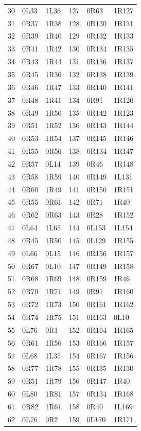 \begin{longtable}{@{}rllrll@{}}
30 & 0L33 & 1L36 & 127 & 0R63 & 1R127\\
31 & 0R37 & 1R38 & 128 & 0R130 & 1R131\\
32 & 0R39 & 1R40 & 129 & 0R132 & 1R133\\
33 & 0R41 & 1R42 & 130 & 0R134 & 1R135\\
34 & 0R43 & 1R44 & 131 & 0R136 & 1R137\\
35 & 0R45 & 1R36 & 132 & 0R138 & 1R139\\
36 & 0R46 & 1R47 & 133 & 0R140 & 1R141\\
37 & 0R48 & 1R41 & 134 & 0R91 & 1R120\\
38 & 0R49 & 1R50 & 135 & 0R142 & 1R123\\
39 & 0R51 & 1R52 & 136 & 0R143 & 1R144\\
40 & 0R53 & 1R54 & 137 & 0R145 & 1R146\\
41 & 0R55 & 0R56 & 138 & 0R134 & 1R147\\
42 & 0R57 & 0L14 & 139 & 0R46 & 1R148\\
43 & 0R58 & 1R59 & 140 & 0R149 & 1L131\\
44 & 0R60 & 1R49 & 141 & 0R150 & 1R151\\
45 & 0R55 & 0R61 & 142 & 0R71 & 1R40\\
46 & 0R62 & 0R63 & 143 & 0R28 & 1R152\\
47 & 0L64 & 1L65 & 144 & 0L153 & 1L154\\
48 & 0R45 & 1R50 & 145 & 0L129 & 1R155\\
49 & 0L66 & 0L15 & 146 & 0R156 & 1R157\\
50 & 0R67 & 0L10 & 147 & 0R149 & 1R158\\
51 & 0R68 & 1R69 & 148 & 0R159 & 1R46\\
52 & 0R70 & 1R71 & 149 & 0R91 & 1R160\\
53 & 0R72 & 1R73 & 150 & 0R161 & 1R162\\
54 & 0R74 & 1R75 & 151 & 0R163 & 0L10\\
55 & 0L76 & 0R1 & 152 & 0R164 & 1R165\\
56 & 0R61 & 1R56 & 153 & 0R166 & 1R157\\
57 & 0L68 & 1L35 & 154 & 0R167 & 1R156\\
58 & 0R77 & 1R78 & 155 & 0R135 & 1R130\\
59 & 0R51 & 1R79 & 156 & 0R147 & 1R40\\
60 & 0L80 & 1R81 & 157 & 0R134 & 1R168\\
61 & 0R82 & 1R61 & 158 & 0R40 & 1L169\\
62 & 0L76 & 0R2 & 159 & 0L170 & 1R171\\

\end{longtable}

